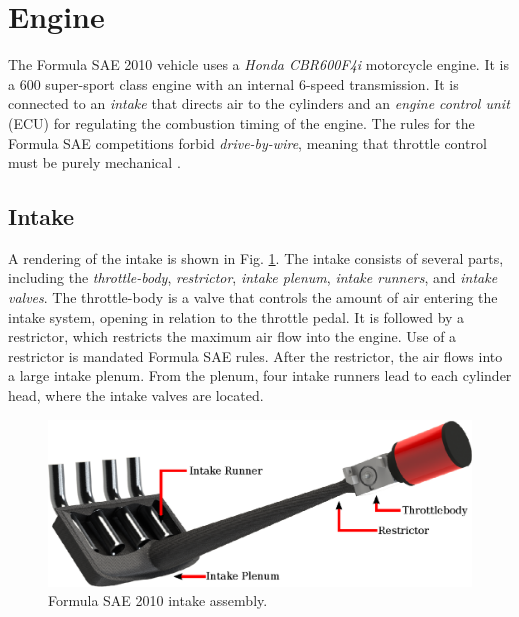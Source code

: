\section{Engine}


The Formula SAE 2010 vehicle uses a \emph{Honda CBR600F4i} motorcycle engine. It is a \unit{600}{\centi\cubic\metre} super-sport class engine with an internal 6-speed transmission. It is connected to an \emph{intake} that directs air to the cylinders and an \emph{engine control unit} (ECU) for regulating the combustion timing of the engine. The rules for the Formula SAE competitions forbid \emph{drive-by-wire}, meaning that throttle control must be purely mechanical \cite{2010fsaerules}.

\subsection{Intake}

A rendering of the intake is shown in Fig. \ref{fig:background_intake_diagram}. The intake consists of several parts, including the \emph{throttle-body}, \emph{restrictor}, \emph{intake plenum}, \emph{intake runners}, and \emph{intake valves}. The throttle-body is a valve that controls the amount of air entering the intake system, opening in relation to the throttle pedal. It is followed by a restrictor, which restricts the maximum air flow into the engine. Use of a restrictor is mandated Formula SAE rules. After the restrictor, the air flows into a large intake plenum. From the plenum, four intake runners lead to each cylinder head, where the intake valves are located.

\begin{figure}[H]
\centering
\includegraphics[scale=1]{background/figures/intake_diagram.eps}
\caption{Formula SAE 2010 intake assembly.}
\label{fig:background_intake_diagram}
\end{figure}


